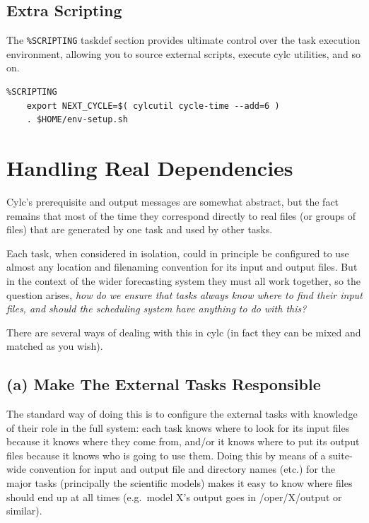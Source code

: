 \documentclass[11pt,a4paper]{article}
\begin{document}
\subsection{Extra Scripting}

The \lstinline=%SCRIPTING= taskdef section provides ultimate
control over the task execution environment, allowing you to source
external scripts, execute cylc utilities, and so on.

\begin{lstlisting}
%SCRIPTING
    export NEXT_CYCLE=$( cylcutil cycle-time --add=6 )
    . $HOME/env-setup.sh
\end{lstlisting}

\pagebreak
\section{Handling Real Dependencies}
\label{HandlingRealDependencies}

Cylc's prerequisite and output messages are somewhat abstract, but the
fact remains that most of the time they correspond directly to real 
files (or groups of files) that are generated by one task and used by
other tasks.

Each task, when considered in isolation, could in principle be
configured to use almost any location and filenaming convention for its
input and output files. But in the context of the wider forecasting
system they must all work together, so the question arises, {\em how do
we ensure that tasks always know where to find their input files, and
should the scheduling system have anything to do with this?} 

There are several ways of dealing with this in cylc (in fact they can
be mixed and matched as you wish). 

\subsection{(a) Make The External Tasks Responsible }

The standard way of doing this is to configure the external tasks with
knowledge of their role in the full system: each task knows where to
look for its input files because it knows where they come from, and/or
it knows where to put its output files because it knows who is going to
use them. Doing this by means of a suite-wide convention for input and
output file and directory names (etc.) for the major tasks (principally
the scientific models) makes it easy to know where files should end up
at all times (e.g.\ model X's output goes in /oper/X/output or similar).
\end{document}

